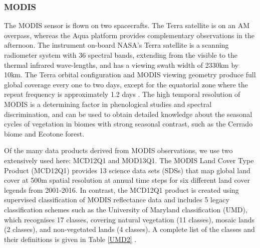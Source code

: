 \subsubsection{MODIS}


The MODIS sensor is flown on two spacecrafts. The Terra satellite is on an AM overpass, whereas the Aqua platform provides complementary observations in the afternoon. The instrument on-board NASA’s Terra satellite is a scanning radiometer system with 36 spectral bands, extending from the visible to the thermal infrared wave-lengths, and has a viewing swath width of 2330km by 10km. The Terra orbital configuration and MODIS viewing geometry produce full global coverage every one to two days, except for the equatorial zone where the repeat frequency is approximately 1.2 days \citep{zhan_2002, setiawan_2014}. The high temporal resolution of MODIS is a determining factor in phenological studies and spectral discrimination, and can be used to obtain detailed knowledge about the seasonal cycles of vegetation in biomes with strong seasonal contrast, such as the Cerrado biome and Ecotone forest. 




Of the many data products derived from MODIS observations, we use two extensively used here: MCD12Q1 and MOD13Q1. The MODIS Land Cover Type Product (MCD12Q1) provides 13 science data sets (SDSs) that map global land cover at 500m spatial resolution at annual time steps for six different land cover legends from 2001-2016. In contrast, the MCD12Q1 product is created using supervised classification of MODIS reflectance data and includes 5 legacy classification schemes such as the University of Maryland classification (UMD), which recognises 17 classes, covering natural vegetation (11 classes), mosaic lands (2 classes), and non-vegetated lands (4 classes). A complete list of the classes and their definitions is given in Table \ref{UMD2} \citep{setiawan_2014, friedl_2018}.


